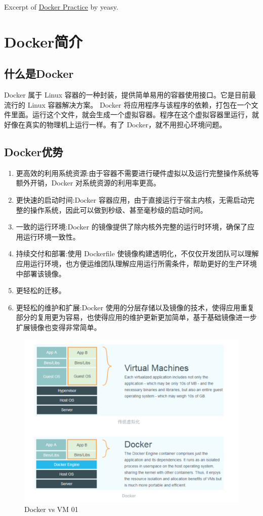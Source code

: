 \documentclass[UTF8]{ctexart}
\begin{document}
Excerpt of \href{https://yeasy.gitbook.io/docker_practice/}{Docker Practice} by yeasy.
\section{Docker简介}
\subsection{什么是Docker}
Docker 属于 Linux 容器的一种封装，提供简单易用的容器使用接口。它是目前最流行的 Linux 容器解决方案。
Docker 将应用程序与该程序的依赖，打包在一个文件里面。运行这个文件，就会生成一个虚拟容器。程序在这个虚拟容器里运行，就好像在真实的物理机上运行一样。有了 Docker，就不用担心环境问题。

\subsection{Docker优势}
\begin{enumerate}
    \item 更高效的利用系统资源:由于容器不需要进行硬件虚拟以及运行完整操作系统等额外开销，Docker 对系统资源的利用率更高。
    \item 更快速的启动时间:Docker 容器应用，由于直接运行于宿主内核，无需启动完整的操作系统，因此可以做到秒级、甚至毫秒级的启动时间。
    \item 一致的运行环境:Docker 的镜像提供了除内核外完整的运行时环境，确保了应用运行环境一致性。
    \item 持续交付和部署:使用 Dockerfile 使镜像构建透明化，不仅仅开发团队可以理解应用运行环境，也方便运维团队理解应用运行所需条件，帮助更好的生产环境中部署该镜像。
    \item 更轻松的迁移。
    \item 更轻松的维护和扩展:Docker 使用的分层存储以及镜像的技术，使得应用重复部分的复用更为容易，也使得应用的维护更新更加简单，基于基础镜像进一步扩展镜像也变得非常简单。
\end{enumerate}
\begin{figure}[htpb]
    \centering
    \includegraphics[scale=0.3]{ch1_docker_vs_vm_01.pdf}
    \caption{Docker vs VM 01}
    \label{fig:docker_vs_vm_01}
\end{figure}
\end{document}
